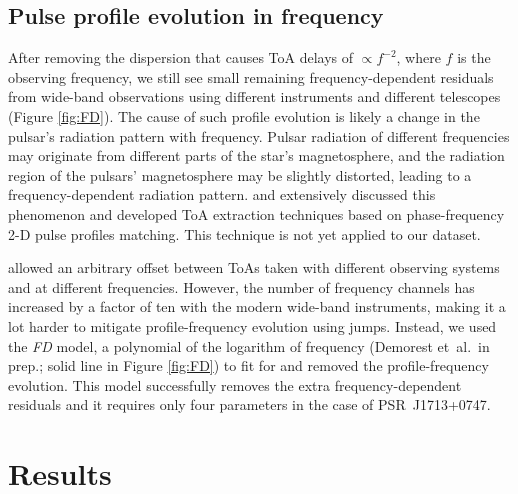 \subsection{Pulse profile evolution in frequency}
\label{sec:FD}
After removing the dispersion that causes ToA delays of $\propto f^{-2}$,
where $f$ is the observing frequency,
 we still see small remaining frequency-dependent residuals from wide-band
observations using
different instruments and different telescopes (Figure \ref{fig:FD}).  
The cause of such profile evolution is likely a change in the pulsar's
radiation pattern with frequency.  Pulsar radiation of different frequencies may originate from
different parts of the star's magnetosphere, and 
the radiation region of the pulsars' magnetosphere may be slightly distorted,
leading to a frequency-dependent radiation pattern. \citet{pdr14} and \citet{ldc+14} 
extensively discussed this phenomenon and developed ToA extraction techniques
based on phase-frequency 2-D pulse profiles matching. This technique is not
yet applied to our dataset.

\citet{sns+05} allowed an arbitrary offset between ToAs taken with different
observing systems and at different frequencies.
However, the number of frequency
channels has increased by a factor of ten with the modern wide-band
instruments, making it a lot harder to mitigate profile-frequency evolution using jumps. 
Instead, we used the {\it FD} model, a polynomial of the logarithm of
frequency (Demorest et~al.\ in prep.; solid line in Figure
\ref{fig:FD}) to fit for and removed the profile-frequency
evolution. This model successfully removes the extra
frequency-dependent residuals and it requires only four parameters in the
case of PSR~J1713+0747.


\section{Results}
\label{sec:res}

